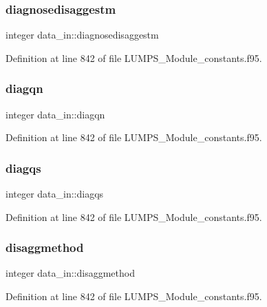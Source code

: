 \subsubsection{\texorpdfstring{diagnosedisaggestm}{diagnosedisaggestm}}
{\footnotesize\ttfamily integer data\+\_\+in\+::diagnosedisaggestm}



Definition at line 842 of file L\+U\+M\+P\+S\+\_\+\+Module\+\_\+constants.\+f95.

\mbox{\label{namespacedata__in_a2d6b128b5a2c8b851ee4fdd38204a18f}} 
\subsubsection{\texorpdfstring{diagqn}{diagqn}}
{\footnotesize\ttfamily integer data\+\_\+in\+::diagqn}



Definition at line 842 of file L\+U\+M\+P\+S\+\_\+\+Module\+\_\+constants.\+f95.

\mbox{\label{namespacedata__in_a2202e62dbdf6e4d935d472a09af97460}} 
\subsubsection{\texorpdfstring{diagqs}{diagqs}}
{\footnotesize\ttfamily integer data\+\_\+in\+::diagqs}



Definition at line 842 of file L\+U\+M\+P\+S\+\_\+\+Module\+\_\+constants.\+f95.

\mbox{\label{namespacedata__in_acdfe353290d799264bab6281a87a1fa7}} 
\subsubsection{\texorpdfstring{disaggmethod}{disaggmethod}}
{\footnotesize\ttfamily integer data\+\_\+in\+::disaggmethod}



Definition at line 842 of file L\+U\+M\+P\+S\+\_\+\+Module\+\_\+constants.\+f95.

